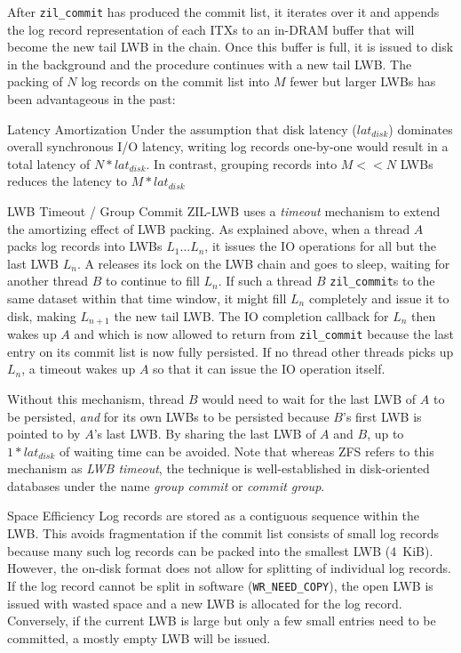 \documentclass[12pt,a4paper,twoside]{book}
\begin{document}
After \lstinline{zil_commit} has produced the commit list, it iterates over it and appends the log record representation of each ITXs to an in-DRAM buffer that will become the new tail LWB in the chain.
Once this buffer is full, it is issued to disk in the background and the procedure continues with a new tail LWB.
The packing of $N$ log records on the commit list into $M$ fewer but larger LWBs has been advantageous in the past:
\begin{description}[noitemsep]
    \item[Latency Amortization]
        Under the assumption that disk latency ($lat_{disk}$) dominates overall synchronous I/O latency, writing log records one-by-one would result in a total latency of $N * lat_{disk}$.
        In contrast, grouping records into $M << N$ LWBs reduces the latency to $M * lat_{disk}$
    \item[LWB Timeout / Group Commit]
        ZIL-LWB uses a \textit{timeout} mechanism to extend the amortizing effect of LWB packing.
        As explained above, when a thread $A$ packs log records into LWBs $L_1 \dots L_n$, it issues the IO operations for all but the last LWB $L_n$.
        A releases its lock on the LWB chain and goes to sleep, waiting for another thread $B$ to continue to fill $L_n$.
        If such a thread $B$ \lstinline{zil_commit}s to the same dataset within that time window, it might fill $L_n$ completely and issue it to disk, making $L_{n+1}$ the new tail LWB.
        The IO completion callback for $L_n$ then wakes up $A$ and which is now allowed to return from \lstinline{zil_commit} because the last entry on its commit list is now fully persisted.
        If no thread other threads picks up $L_n$, a timeout wakes up $A$ so that it can issue the IO operation itself.

        Without this mechanism, thread $B$ would need to wait for the last LWB of $A$ to be persisted, \textit{and} for its own LWBs to be persisted because $B$'s first LWB is pointed to by $A$'s last LWB.
        By sharing the last LWB of $A$ and $B$, up to $1 * lat_{disk}$ of waiting time can be avoided.
        Note that whereas ZFS refers to this mechanism as \textit{LWB timeout}, the technique is well-established in disk-oriented databases under the name \textit{group commit} or \textit{commit group}.

    \item[Space Efficiency]
        Log records are stored as a contiguous sequence within the LWB.
        This avoids fragmentation if the commit list consists of small log records because many such log records can be packed into the smallest LWB (4~KiB).
        However, the on-disk format does not allow for splitting of individual log records.
        If the log record cannot be split in software (\lstinline{WR_NEED_COPY}), the open LWB is issued with wasted space and a new LWB is allocated for the log record.
        Conversely, if the current LWB is large but only a few small entries need to be committed, a mostly empty LWB will be issued.
\end{description}
\end{document}
